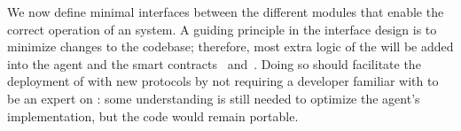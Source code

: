 

We now define minimal interfaces between the different modules that enable the correct operation of an \ipcFull system.
A guiding principle in the interface design is to minimize changes to the \smr codebase; therefore, most extra logic of the \ipc will be added into the \ipc agent and the smart contracts \sa~and~\gw. Doing so should facilitate the deployment of \ipc with new \smr protocols by not requiring a developer familiar with \ipc to be an expert on \smr: some understanding is still needed to optimize the agent's implementation, but the \smr code would remain portable.

